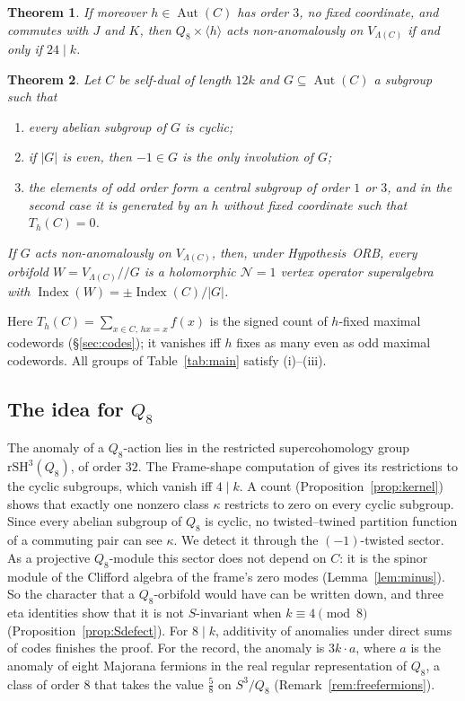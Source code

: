 \documentclass[11pt]{amsart}
\newtheorem{theorem}{Theorem}[section]
\theoremstyle{definition}
\newcommand{\cN}{\mathcal N}
\newcommand{\Index}{\operatorname{Index}}
\newcommand{\Aut}{\operatorname{Aut}}
\newcommand{\rSH}{\mathrm{rSH}^3}
\newcommand{\orb}{/\!\!/}
\begin{document}
\begin{theorem}\label{thm:Q8Z3}
If moreover $h\in\Aut(C)$ has order $3$, no fixed coordinate, and commutes with $J$ and $K$, then
$Q_8\times\langle h\rangle$ acts non-anomalously on $V_{\Lambda(C)}$ if and only if $24\mid k$.
\end{theorem}

\begin{theorem}\label{thm:index}
Let $C$ be self-dual of length $12k$ and $G\subseteq\Aut(C)$ a subgroup such that
\begin{enumerate}
\item[(i)] every abelian subgroup of $G$ is cyclic;
\item[(ii)] if $|G|$ is even, then $-1\in G$ is the only involution of $G$;
\item[(iii)] the elements of odd order form a central subgroup of order $1$ or $3$, and in the second case
  it is generated by an $h$ without fixed coordinate such that $T_h(C)=0$.
\end{enumerate}
If $G$ acts non-anomalously on $V_{\Lambda(C)}$, then, under Hypothesis~ORB, every orbifold
$W=V_{\Lambda(C)}\orb G$ is a holomorphic $\cN=1$ vertex operator superalgebra with
$\Index(W)=\pm\Index(C)/|G|$.
\end{theorem}

Here $T_h(C)=\sum_{x\in C,\,hx=x}f(x)$ is the signed count of $h$-fixed maximal codewords
(\S\ref{sec:codes}); it vanishes iff $h$ fixes as many even as odd maximal codewords. All groups of
Table~\ref{tab:main} satisfy (i)--(iii).

\subsection*{The idea for \texorpdfstring{$Q_8$}{Q8}}
The anomaly of a $Q_8$-action lies in the restricted supercohomology group $\rSH(Q_8)$, of order $32$.
The Frame-shape computation of \cite[Ex.~4.4]{GJF} gives its restrictions to the cyclic subgroups, which
vanish iff $4\mid k$. A count (Proposition~\ref{prop:kernel}) shows that exactly one nonzero class
$\kappa$ restricts to zero on every cyclic subgroup. Since every abelian subgroup of $Q_8$ is cyclic, no
twisted--twined partition function of a commuting pair can see $\kappa$. We detect it through the
$(-1)$-twisted sector. As a projective $Q_8$-module this sector does not depend on $C$: it is the
spinor module of the Clifford algebra of the frame's zero modes (Lemma~\ref{lem:minus}). So the
character that a $Q_8$-orbifold would have can be written down, and three eta identities show that it
is not $S$-invariant when $k\equiv4\pmod8$ (Proposition~\ref{prop:Sdefect}). For $8\mid k$, additivity
of anomalies under direct sums of codes finishes the proof. For the record, the anomaly is $3k\cdot a$,
where $a$ is the anomaly of eight Majorana fermions in the real regular representation of $Q_8$, a class
of order $8$ that takes the value $\tfrac58$ on $S^3/Q_8$ (Remark~\ref{rem:freefermions}).
\end{document}
